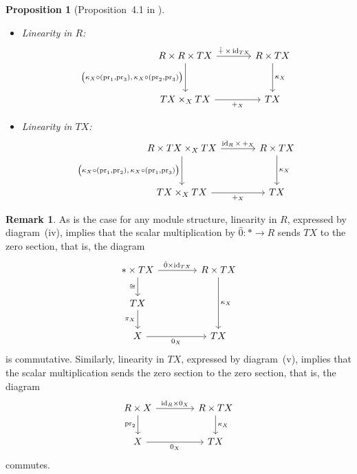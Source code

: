 \documentclass[12pt,reqno, a4paper]{amsart}
\numberwithin{equation}{section}
\theoremstyle{plain}
\newtheorem{Proposition}[Theorem]{Proposition}
\theoremstyle{definition}
\newtheorem{Remark}[Theorem]{Remark}
\theoremstyle{remark}
\newcommand{\id}{\mathrm{id}}
\newcommand{\pr}{\mathrm{pr}}
\newcommand{\Radd}{\hat{+}}
\newcommand{\Rzero}{\hat{0}}
\begin{document}
\begin{Proposition}[Proposition~4.1 in \cite{AintablianBlohmann:2026}]
\begin{itemize}
\item[(iv)] Linearity in $R$:
\begin{equation*}
\begin{tikzcd}[column sep={large}, row sep=3em]
R \times R \times TX
\ar[r, "\Radd \, \times \, \id_{TX}"]
\ar[d, "{\big( \kappa_X \circ (\pr_1, \pr_3), \, \kappa_X \circ (\pr_2, \pr_3) \big)}"'] &
R \times TX
\ar[d, "\kappa_X"]
\\
TX \times_X TX
\ar[r, "+_X"']
&
TX
\end{tikzcd}
\end{equation*}

\item[(v)] Linearity in $TX$:
\begin{equation*}
\begin{tikzcd}[column sep={large}, row sep=3em]
R \times TX \times_X TX
\ar[r, "\id_R \, \times \, +_X"]
\ar[d, "{\bigl( \kappa_X \circ (\pr_1, \pr_2), \, \kappa_X \circ (\pr_1, \pr_3) \bigr)}"'] &
R \times TX
\ar[d, "\kappa_X"]
\\
TX \times_X TX
\ar[r, "+_X"']
&
TX
\end{tikzcd}
\end{equation*}
\end{itemize}
\end{Proposition}

\begin{Remark}
As is the case for any module structure, linearity in $R$, expressed by diagram~(iv), implies that the scalar multiplication by $\Rzero: * \to R$ sends $TX$ to the zero section, that is, the diagram
\begin{equation}
\label{diag:RzeroPreserve}
\begin{tikzcd}[column sep=4em,row sep=2em]
* \times TX \ar[r, "{\Rzero \times \id_{TX}}"] \ar[d, "{\cong}"'] & R \times TX \ar[dd, "{\kappa_{X}}"] \\
TX \ar[d, "\pi_X"'] & \\
X \ar[r, "0_X"'] & TX
\end{tikzcd}
\end{equation}
is commutative. Similarly, linearity in $TX$, expressed by diagram~(v), implies that the scalar multiplication sends the zero section to the zero section, that is, the diagram
\begin{equation}
\label{diag:RzeroPreserve2}
\begin{tikzcd}[column sep=4em,row sep=2em]
R \times X \ar[r, "{\id_R \times 0_{X}}"] \ar[d, "{\pr_2}"'] & R \times TX \ar[d, "{\kappa_{X}}"]
\\
X \ar[r, "0_X"'] & TX
\end{tikzcd}
\end{equation}
commutes.
\end{Remark}
\end{document}
